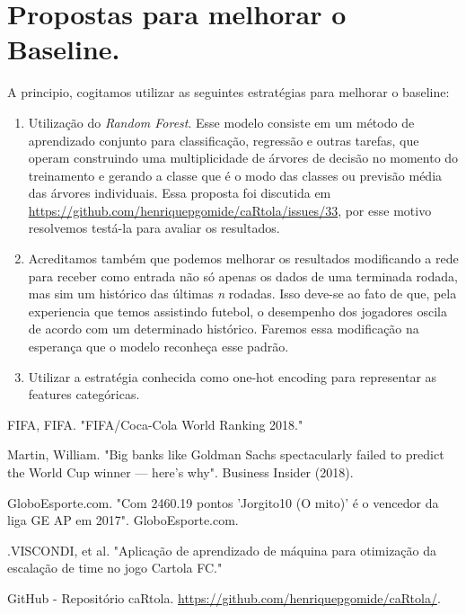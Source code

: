 \documentclass[conference]{IEEEtran}
\begin{document}
\section{Propostas para melhorar o Baseline.}
A principio, cogitamos utilizar as seguintes estratégias para melhorar o baseline:

\begin{enumerate}
	\item Utilização do \textit{Random Forest}. Esse modelo consiste em um método de aprendizado conjunto para classificação, regressão e outras tarefas, que operam construindo uma multiplicidade de árvores de decisão no momento do treinamento e gerando a classe que é o modo das classes ou previsão média das árvores individuais. Essa proposta foi discutida em \url{https://github.com/henriquepgomide/caRtola/issues/33}, por esse motivo resolvemos testá-la para avaliar os resultados.
	\item Acreditamos também que podemos melhorar os resultados modificando a rede para receber como entrada não só apenas os dados de uma terminada rodada, mas sim um histórico das últimas \textit{n} rodadas. Isso deve-se ao fato de que, pela experiencia que temos assistindo futebol, o desempenho dos jogadores oscila de acordo com um determinado histórico. Faremos essa modificação na esperança que o modelo reconheça esse padrão.
	\item Utilizar a estratégia conhecida como one-hot encoding para representar as features categóricas.
\end{enumerate}




\begin{thebibliography}{00}

 FIFA, FIFA. "FIFA/Coca-Cola World Ranking 2018."

  Martin,   William.  "Big  banks  like   Goldman  Sachs
spectacularly failed to predict the  World Cup winner — here's why".
Business Insider (2018).

 GloboEsporte.com. "Com 2460.19 pontos 'Jorgito10
(O mito)' é o vencedor da liga GE AP em 2017". GloboEsporte.com.

   .VISCONDI,   et  al.   "Aplicação   de
aprendizado de  máquina para otimização  da escalação de  time no
jogo Cartola FC."

      GitHub     -      Repositório     caRtola.
\url{https://github.com/henriquepgomide/caRtola/}.

\end{thebibliography}
\end{document}

